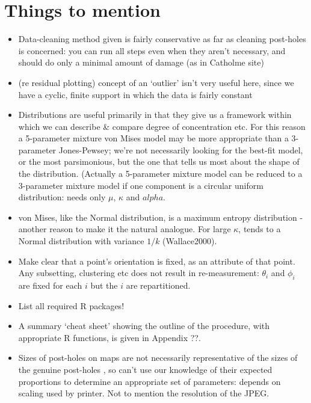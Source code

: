 \documentclass[12pt,fleqn]{article}
\numberwithin{equation}{section}
\begin{document}
\section*{Things to mention}
\begin{itemize}

\item
Data-cleaning method given is fairly conservative as far as cleaning post-holes is concerned: you can run all steps even when they aren't necessary, and should do only a minimal amount of damage (as in Catholme site)

\item
(re residual plotting) concept of an `outlier' isn't very useful here, since we have a cyclic, finite support in which the data is fairly constant
 
\item
Distributions are useful primarily in that they give us a framework within which we can  describe \& compare degree of concentration etc. For this reason a 5-parameter mixture von Mises model may be more appropriate than a 3-parameter Jones-Pewsey; we're not necessarily looking for the best-fit model, or the most parsimonious, but the one that tells us most about the shape of the distribution. (Actually a 5-parameter mixture model can be reduced to a 3-parameter mixture model if one component is a circular uniform distribution: needs only $\mu$, $\kappa$ and $alpha$.

\item
von Mises, like the Normal distribution, is a maximum entropy distribution - another reason to make it the natural analogue. For large $\kappa$, tends to a Normal distribution with variance $1/k$ (Wallace2000).

\item
Make clear that a point's orientation is fixed, as an attribute of that point. Any subsetting, clustering etc does not result in re-measurement: $\theta_i$ and $\phi_i$ are fixed for each $i$ but the $i$ are repartitioned.

\item
List all required R packages!

\item
A summary `cheat sheet' showing the outline of the procedure, with appropriate R functions, is given in Appendix ??.

\item
Sizes of post-holes on maps are not necessarily representative of the sizes of the genuine post-holes , so can't use our knowledge of their expected proportions to determine an appropriate set of parameters: depends on scaling used by printer. Not to mention the resolution of the JPEG.


\end{itemize}
\end{document}

